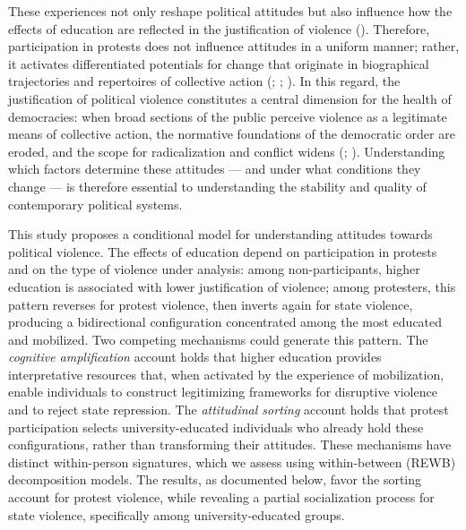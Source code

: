 \documentclass[
  13pt,
]{article}
\begin{document}
These experiences not only reshape political attitudes but also
influence how the effects of education are reflected in the
justification of violence (). Therefore, participation in protests does not influence
attitudes in a uniform manner; rather, it activates differentiated
potentials for change that originate in biographical trajectories and
repertoires of collective action
(;
;
). In this regard,
the justification of political violence constitutes a central dimension
for the health of democracies: when broad sections of the public
perceive violence as a legitimate means of collective action, the
normative foundations of the democratic order are eroded, and the scope
for radicalization and conflict widens
(;
). Understanding
which factors determine these attitudes --- and under what conditions
they change --- is therefore essential to understanding the stability
and quality of contemporary political systems.

This study proposes a conditional model for understanding attitudes
towards political violence. The effects of education depend on
participation in protests and on the type of violence under analysis:
among non-participants, higher education is associated with lower
justification of violence; among protesters, this pattern reverses for
protest violence, then inverts again for state violence, producing a
bidirectional configuration concentrated among the most educated and
mobilized. Two competing mechanisms could generate this pattern. The
\emph{cognitive amplification} account holds that higher education
provides interpretative resources that, when activated by the experience
of mobilization, enable individuals to construct legitimizing frameworks
for disruptive violence and to reject state repression. The
\emph{attitudinal sorting} account holds that protest participation
selects university-educated individuals who already hold these
configurations, rather than transforming their attitudes. These
mechanisms have distinct within-person signatures, which we assess using
within-between (REWB) decomposition models. The results, as documented
below, favor the sorting account for protest violence, while revealing a
partial socialization process for state violence, specifically among
university-educated groups.
\end{document}
